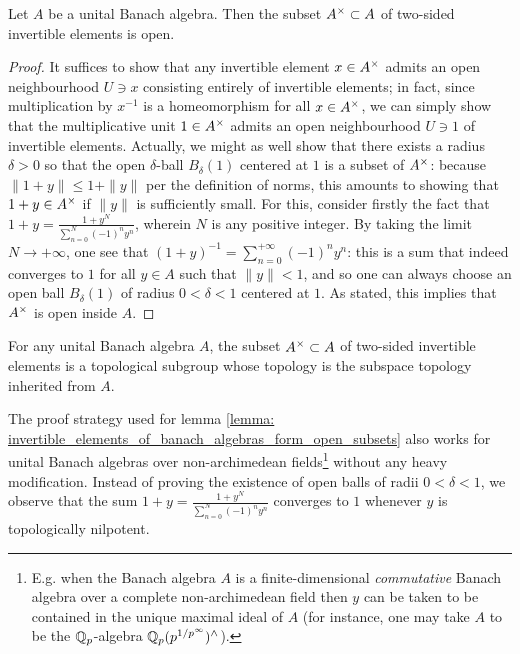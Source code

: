            \begin{lemma} \label{lemma: invertible_elements_of_banach_algebras_form_open_subsets}
                Let $A$ be a unital Banach algebra. Then the subset $A^{\x} \subset A$ of two-sided invertible elements is open.
            \end{lemma}
                \begin{proof}
                    It suffices to show that any invertible element $x \in A^{\x}$ admits an open neighbourhood $U \ni x$ consisting entirely of invertible elements; in fact, since multiplication by $x^{-1}$ is a homeomorphism for all $x \in A^{\x}$, we can simply show that the multiplicative unit $1 \in A^{\x}$ admits an open neighbourhood $U \ni 1$ of invertible elements. Actually, we might as well show that there exists a radius $\delta > 0$ so that the open $\delta$-ball $B_{\delta}(1)$ centered at $1$ is a subset of $A^{\x}$: because $\|1 + y\| \leq 1 + \|y\|$ per the definition of norms, this amounts to showing that $1 + y \in A^{\x}$ if $\|y\|$ is sufficiently small. For this, consider firstly the fact that $1 + y = \frac{1 + y^N}{\sum_{n = 0}^N (-1)^n y^n}$, wherein $N$ is any positive integer. By taking the limit $N \to +\infty$, one see that $(1 + y)^{-1} = \sum_{n = 0}^{+\infty} (-1)^n y^n$: this is a sum that indeed converges to $1$ for all $y \in A$ such that $\|y\| < 1$, and so one can always choose an open ball $B_{\delta}(1)$ of radius $0 < \delta < 1$ centered at $1$. As stated, this implies that $A^{\x}$ is open inside $A$.
                \end{proof}
            \begin{corollary}
                For any unital Banach algebra $A$, the subset $A^{\x} \subset A$ of two-sided invertible elements is a topological subgroup whose topology is the subspace topology inherited from $A$. 
            \end{corollary}
            \begin{remark}
                The proof strategy used for lemma \ref{lemma: invertible_elements_of_banach_algebras_form_open_subsets} also works for unital Banach algebras over non-archimedean fields\footnote{E.g. when the Banach algebra $A$ is a finite-dimensional \textit{commutative} Banach algebra over a complete non-archimedean field then $y$ can be taken to be contained in the unique maximal ideal of $A$ (for instance, one may take $A$ to be the $\mathbb{Q}_p$-algebra $\mathbb{Q}_p(p^{1/p^{\infty}})^{\wedge}$).} without any heavy modification. Instead of proving the existence of open balls of radii $0 < \delta < 1$, we observe that the sum $1 + y = \frac{1 + y^N}{\sum_{n = 0}^N (-1)^n y^n}$ converges to $1$ whenever $y$ is topologically nilpotent. 
            \end{remark}
